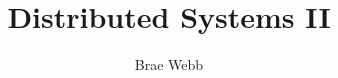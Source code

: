 \documentclass{csse4400}
\title{Distributed Systems II}
\author{Brae Webb}
\date{\week{6}}
\begin{document}
\makecover





\end{document}
